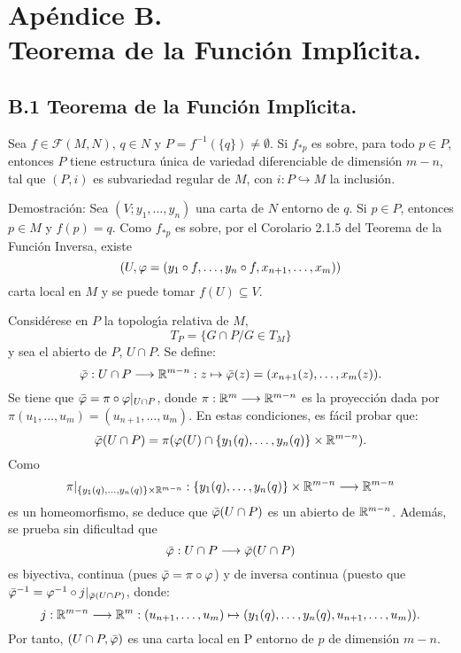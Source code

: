 \documentclass[cursovd_portada.tex]{subfiles}
\begin{document}
\chapter*{Ap\'endice B.\\Teorema de la Funci\'on Impl\'{\i}cita.}
\section*{B.1 Teorema de la Funci\'{o}n Impl\'{\i}cita.}
\begin{teoap}
Sea $f\in\mathcal{F}(M,N)$, $q\in N$ y $P=f^{-1}(\{q\})\neq\emptyset$. Si $f_{*p}$ es sobre, para todo $p\in P$,
entonces $P$ tiene estructura \'{u}nica de variedad diferenciable de dimensi\'{o}n $m-n$, tal que $(P,i)$ es subvariedad
regular de $M$, con $i:P\hookrightarrow M$ la inclusi\'{o}n.
\end{teoap}
{\sc Demostraci\'{o}n:} Sea $(V;y_1,\dots ,y_n)$ una carta de $N$ entorno de $q$. Si $p\in P$, entonces $p\in M$ y
$f(p)=q$. Como $f_{*p}$ es sobre, por el Corolario 2.1.5 del Teorema de la Funci\'{o}n Inversa, existe
$$(U,\varphi=(y_1\circ f,\dots ,y_n\circ f,x_{n+1},\dots ,x_m))$$
carta local en $M$ y se puede tomar $f(U)\subseteq V$.
\par
Consid\'{e}rese en $P$ la topolog\'{\i}a relativa de $M$,
$$T_P=\{G\cap P/G\in T_M\}$$
y sea el abierto de $P$, $U\cap P$. Se define:
$$\bar{\varphi}:U\cap P\longrightarrow\mathbb{R}^{m-n}:z\mapsto\bar{\varphi}(z)=(x_{n+1}(z),\dots ,
x_m(z)).$$ \hs Se tiene que $\bar{\varphi}=\pi\circ\varphi|_{U\cap P}$, donde $\pi:\mathbb{R}^m\longrightarrow\mathbb{R}^{m-n}$ es la proyecci\'{o}n dada
por $\pi(u_1,\dots ,u_m)=(u_{n+1},\dots ,u_m)$. En estas condiciones, es f\'{a}cil probar que:
$$\bar{\varphi}(U\cap P)=\pi(\varphi(U)\cap\{y_1(q),\dots ,y_n(q)\}\times\mathbb{R}^{m-n}).$$
\hs Como
$$\pi|_{\{y_1(q),\dots ,y_n(q)\}\times\mathbb{R}^{m-n}}:\{y_1(q),\dots ,y_n(q)\}\times
\mathbb{R}^{m-n}\longrightarrow\mathbb{R}^{m-n}$$ es un homeomorfismo, se deduce que $\bar{\varphi}(U\cap P)$ es un abierto de $\mathbb{R}^{m-n}$. Adem\'{a}s,
se prueba sin dificultad que
$$\bar{\varphi}:U\cap P\longrightarrow\bar{\varphi}(U\cap P)$$
es biyectiva, continua (pues $\bar{\varphi}=\pi\circ\varphi$) y de inversa continua (puesto que
$\bar{\varphi}^{-1}=\varphi^{-1}\circ j|_{\bar{\varphi}(U\cap P)}$, donde:
$$j:\mathbb{R}^{m-n}\longrightarrow\mathbb{R}^m:(u_{n+1},\dots ,u_m)\mapsto(y_1(q),\dots ,y_n(q),u_{n+1},
\dots ,u_m)).$$ \hs Por tanto, $(U\cap P,\bar{\varphi})$ es una carta local en P entorno de $p$ de dimensi\'{o}n $m-n$.
\end{document}
